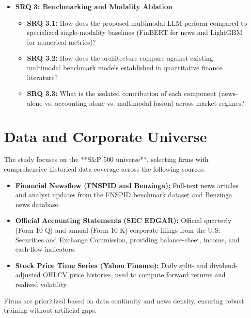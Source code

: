 \documentclass[11pt,a4paper]{article}
\begin{document}
\begin{itemize}[leftmargin=*, label=$\mathbf{\blacktriangleright}$]
\begin{itemize}[leftmargin=*, label=$\mathbf{\triangleright}$]
        \item \textbf{SRQ 3: Benchmarking and Modality Ablation}
        \begin{itemize}[label=$\circ$]
            \item \textbf{SRQ 3.1:} How does the proposed multimodal LLM perform compared to specialized single-modality baselines (FinBERT for news and LightGBM for numerical metrics)?
            \item \textbf{SRQ 3.2:} How does the architecture compare against existing multimodal benchmark models established in quantitative finance literature?
            \item \textbf{SRQ 3.3:} What is the isolated contribution of each component (news-alone vs. accounting-alone vs. multimodal fusion) across market regimes?
        \end{itemize}
    \end{itemize}
\end{itemize}

\section{Data and Corporate Universe}
\label{sec:data}

The study focuses on the **S\&P 500 universe**, selecting firms with comprehensive historical data coverage across the following sources:
\begin{itemize}[leftmargin=*]
    \item \textbf{Financial Newsflow (FNSPID and Benzinga):} Full-text news articles and analyst updates from the FNSPID benchmark dataset \citep{dong2024fnspid} and Benzinga news database.
    \item \textbf{Official Accounting Statements (SEC EDGAR):} Official quarterly (Form 10-Q) and annual (Form 10-K) corporate filings from the U.S. Securities and Exchange Commission, providing balance-sheet, income, and cash-flow indicators.
    \item \textbf{Stock Price Time Series (Yahoo Finance):} Daily split- and dividend-adjusted OHLCV price histories, used to compute forward returns and realized volatility.
\end{itemize}

Firms are prioritized based on data continuity and news density, ensuring robust training without artificial gaps.
\end{document}
